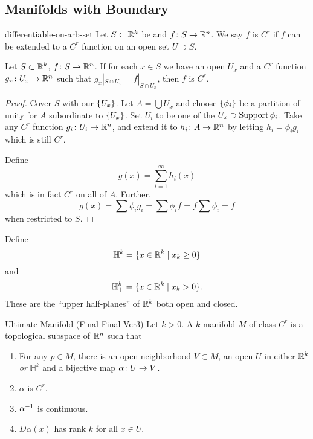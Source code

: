 \documentclass{article}
\begin{document}
\subsection{Manifolds with Boundary}

\begin{definition}{}{differentiable-on-arb-set}
  Let $S \subset \RR[k]$ be and $f \from S \to \RR[n]$.
  We say $f$ is $C^{r}$ if $f$ can be extended to a $C^{r}$ function on an open set $U \supset S$.
\end{definition}

\begin{lemma}{}{}
  Let $S \subset \RR[k]$, $f \from S \to \RR[n]$.
  If for each $x \in S$ we have an open $U_{x}$ and a $C^{r}$ function $g_{x} \from U_{x} \to \RR[n]$
  such that $g_{x}|_{S \cap U_{x}} = f|_{S \cap U_{x}}$, then $f$ is $C^{r}$.
\end{lemma}
\begin{proof}
  Cover $S$ with our $\set{U_{x}}$. Let $A = \bigcup U_{x}$ and choose $\set{\phi_{i}}$
  be a partition of unity for $A$ subordinate to $\set{U_{x}}$.
  Set $U_{i}$ to be one of the $U_{x} \supset \Support \phi_{i}$.
  Take any $C^{r}$ function $g_{i} \from U_{i} \to \RR[n]$,
  and extend it to $h_{i} \from A \to \RR[n]$ by letting $h_{i} = \phi_{i}g_{i}$ which is still $C^{r}$.

  Define
  \[ g(x) = \sum_{i = 1}^{\infty}h_{i}(x) \]
  which is in fact $C^{r}$ on all of $A$.
  Further,
  \[ g(x) = \sum \phi_{i}g_{i} = \sum \phi_{i}f = f \sum \phi_{i} = f \]
  when restricted to $S$.
\end{proof}

\begin{definition}{}{}
  Define
  \[ \mathbb{H}^{k} = \set{ x \in \RR[k] \mid x_{k} \ge 0 } \]
  and
  \[ \mathbb{H}_{+}^{k} = \set{ x \in \RR[k] \mid x_{k} > 0 }. \]
  These are the ``upper half-planes'' of $\RR[k]$ both open and closed.
\end{definition}

\begin{definition}{Ultimate Manifold (Final Final Ver3)}{}
  Let $k > 0$.
  A $k$-manifold $M$ of class $C^{r}$ is a topological subspace of $\RR[n]$ such that
  \begin{enumerate}[start=1,label={\arabic*\rparen}]
    \item For any $p \in M$, there is an open neighborhood $V \subset M$,
          an open $U$ in either $\RR[k]$ \emph{or} $\mathbb{H}^{k}$
          and a bijective map $\alpha \from U \to V$.
    \item $\alpha$ is $C^{r}$.
    \item $\alpha\inv$ is continuous.
    \item $D\alpha(x)$ has rank $k$ for all $x \in U$.
  \end{enumerate}
\end{definition}
\end{document}
